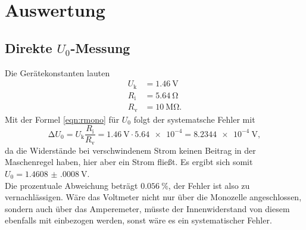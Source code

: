 \section{Auswertung}
\label{sec:Auswertung}



\subsection{Direkte $U_0$-Messung}
\label{sec:u0}
Die Gerätekonstanten lauten
\begin{align}
      U_\text{k} &= \SI{1.46}{\volt} \\
      R_\text{i} &= \SI{5.64}{\ohm} \\
      R_\text{v} &= \SI{10}{\mega\ohm} .
\end{align}
Mit der Formel \eqref{eqn:rmono} für $U_0$ folgt der systematsche Fehler mit
\begin{equation}
      \increment U_0 = U_\text{k} \frac{R_\text{i}}{R_\text{v}} = \SI{1.46}{\volt} \cdot \num{5.64e-4} = \SI{8.2344e-4}{\volt},
\end{equation}
da die Widerstände bei verschwindenem Strom keinen Beitrag in der Maschenregel haben,
hier aber ein Strom fließt.
Es ergibt sich somit $U_0 = \SI{1.4608(0008)}{\volt}$.
\\
Die prozentuale Abweichung beträgt $\SI{0,056}{\percent}$, der Fehler ist
also zu vernachlässigen. Wäre das Voltmeter nicht nur über die Monozelle angeschlossen,
sondern auch über das Amperemeter, müsste der Innenwiderstand von diesem ebenfalls
mit einbezogen werden, sonst wäre es ein systematischer Fehler.


